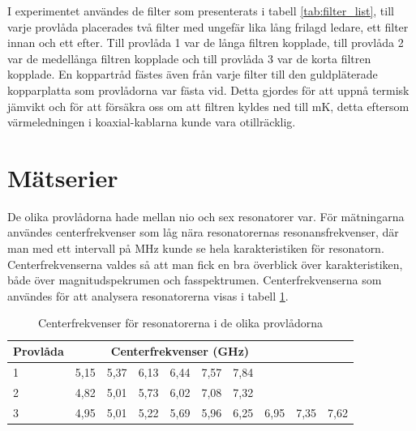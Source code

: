 \documentclass[main.tex]{subfiles}
\begin{document}
I experimentet användes de filter som presenterats i tabell \ref{tab:filter_list}, till varje provlåda placerades två filter med ungefär lika lång frilagd ledare, ett filter innan och ett efter. Till provlåda 1 var de långa filtren kopplade, till provlåda 2 var de medellånga filtren kopplade och till provlåda 3 var de korta filtren kopplade. En koppartråd fästes även från varje filter till den guldpläterade kopparplatta som provlådorna var fästa vid. Detta gjordes för att uppnå termisk jämvikt och för att försäkra oss om att filtren kyldes ned till \unit[10]{mK}, detta eftersom värmeledningen i koaxial-kablarna kunde vara otillräcklig. %


\section{Mätserier}


De olika provlådorna hade mellan nio och sex resonatorer var. För mätningarna användes centerfrekvenser som låg nära resonatorernas resonansfrekvenser, där man med ett intervall på \unit[3]{MHz} kunde se hela karakteristiken för resonatorn. Centerfrekvenserna valdes så att man fick en bra överblick över karakteristiken, både över magnitudspekrumen och fasspektrumen. Centerfrekvenserna som användes för att analysera resonatorerna visas i tabell \ref{tab:utanfil}. 

\begin{table}[h]
    \centering
        \caption{Centerfrekvenser för resonatorerna i de olika provlådorna}
    \label{tab:utanfil}
    \begin{tabular}{lccccccccc}
    \toprule
        \textbf{Provlåda}  & \multicolumn{7}{c}{Centerfrekvenser (GHz)} \\
        \midrule
        1 & 5,15 & 5,37 & 6,13 & 6,44 & 7,57 & 7,84 &\\
        2 & 4,82 & 5,01 & 5,73 & 6,02 & 7,08  &  7,32 & \\
        3 & 4,95 & 5,01 & 5,22 & 5,69 & 5,96 & 6,25 & 6,95 & 7,35 & 7,62\\
        \bottomrule
    \end{tabular}
\end{table}

\end{document}

